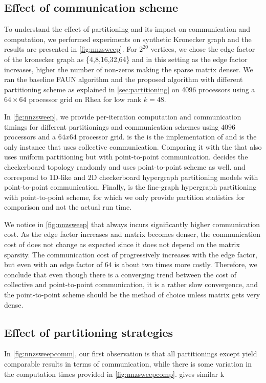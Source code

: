 \subsection {Effect of communication scheme}
To understand the effect of partitioning and its impact on communication and computation, we performed
experiments on synthetic Kronecker graph and the results are presented in \cref{fig:nnzsweep}. 
For $2^{20}$ vertices, we chose the edge factor of the kronecker graph as \{4,8,16,32,64\} and in
this setting as the edge factor increases,  higher the number of  non-zeros making the sparse matrix
denser. We ran the baseline FAUN algorithm and the proposed algorithm with different partitioning 
scheme as explained in \cref{sec:partitioning} on 4096 processors using a $64 \times 64$ processor grid on Rhea for low rank $k=48$. 

In \cref{fig:nnzsweep}, we provide per-iteration computation and communication timings for different partitionings and communication schemes using $4096$ processors and a $64x64$ processor grid.
\krfaun is the is the implementation of \mpifaun and is the only instance that uses collective communication.
Comparing it with the \krcun that also uses uniform partitioning but with point-to-point communication.
\krcr decides the checkerboard topology randomly and uses point-to-point scheme as well.
\krcha and \krchb correspond to 1D-like and 2D checkerboard hypergraph partitioning models with point-to-point communication.
Finally, \krfh is the fine-graph hypergraph partitioning with point-to-point scheme, for which we only provide partition statistics for comparison and not the actual run time.

We notice in \cref{fig:nnzsweep} that \krfaun always incurs significantly higher communication cost.
As the edge factor increases and matrix becomes denser, the communication cost of \krfaun does not change as expected since it does not depend on the matrix sparsity.
The communication cost of \krcun progressively increases with the edge factor, but even with an edge factor of $64$ \krfaun is about two times more costly.
Therefore, we conclude that even though there is a converging trend between the cost of collective and point-to-point communication, it is a rather slow convergence, and the point-to-point scheme should be the method of choice unless matrix gets very dense.

\subsection {Effect of partitioning strategies}
In \cref{fig:nnzsweepcomm}, our first observation is that all partitionings except \krfaun yield comparable results in terms of communication, while there is some variation  in the computation times provided in \cref{fig:nnzsweepcomp}.
\krcun gives similar k

